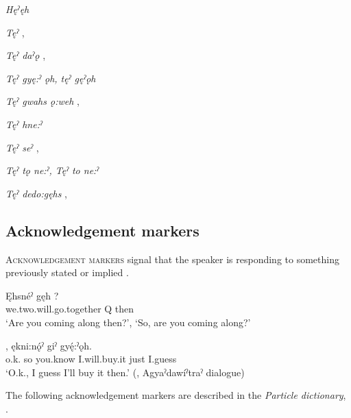\begin{CayugaRelated}
\item{}\textit{Hęˀęh} \\
\item{}\textit{Tęˀ} , \\
\item{}\textit{Tęˀ daˀǫ} , \\
\item{}\textit{Tęˀ gyę:ˀ ǫh, tęˀ gęˀǫh} \\
\item{}\textit{Tęˀ gwahs ǫ:weh} , \\
\item{}\textit{Tęˀ hne:ˀ} \\
\item{}\textit{Tęˀ seˀ} , \\
\item{}\textit{Tęˀ tǫ ne:ˀ, Tęˀ to ne:ˀ} \\
\item{}\textit{Tęˀ dedo:gęhs} , \\
\end{CayugaRelated}



\subsection{Acknowledgement markers} \label{ch:Acknowledgement markers}
\textsc{Acknowledgement markers} signal that the speaker is responding to something previously stated or implied . 

\ea\label{ex:acknowledgement}
 \gll Ęhsnéˀ gęh ? \\
we.two.will.go.together Q then\\
\glt ‘Are you coming along then?’, ‘So, are you coming along?’
\z

\ea\label{ex:acknowledgement2}
 \gll {}  , ękni:nǫ́ˀ giˀ gyę́:ˀǫh.\\
o.k. so you.know I.will.buy.it just I.guess\\
\glt ‘O.k., I guess I’ll buy it then.’ (\cite[225]{mithun_watewayestanih_1984}, Agyaˀdawíˀtraˀ dialogue)
\z

The following acknowledgement markers are described in the \textit{Particle dictionary}, .

